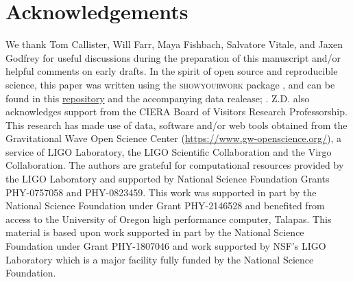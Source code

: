 \documentclass[twocolumn,linenumbers]{aastex631}
\begin{document}






\section{Acknowledgements}\label{sec:acknowledments}
We thank Tom Callister, Will Farr, Maya Fishbach, Salvatore Vitale, and Jaxen Godfrey for useful discussions during the 
preparation of this manuscript and/or helpful comments on early drafts. In the spirit of open source and 
reproducible science, this paper was written using the \textsc{showyourwork} package \citep{Luger2021}, and can be 
found in this \href{https://github.com/bruce-edelman/CoveringYourBasis}{repository} and the accompanying data realease; \citet{edelman_bruce_2022_7422514}. Z.D. also acknowledges support from 
the CIERA Board of Visitors Research Professorship.  This research has made use of data, software and/or web tools obtained 
from the Gravitational Wave Open Science Center (\url{https://www.gw-openscience.org/}), a service of LIGO Laboratory, the 
LIGO Scientific Collaboration and the Virgo Collaboration. The authors are grateful for computational resources 
provided by the LIGO Laboratory and supported by National Science Foundation Grants PHY-0757058 and PHY-0823459.  
This work was supported in part by the National Science Foundation under Grant PHY-2146528 and benefited from access 
to the University of Oregon high performance computer, Talapas. This material is based upon work supported in part 
by the National Science Foundation under Grant PHY-1807046 and work supported by NSF's LIGO Laboratory which is a major 
facility fully funded by the National Science Foundation.


{}



\end{document}
